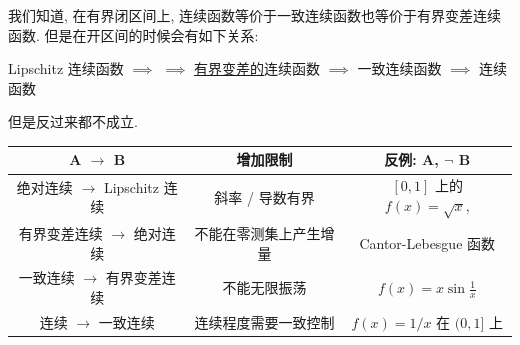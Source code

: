 \begin{rmk}
    我们知道, 在有界闭区间上, 连续函数等价于一致连续函数也等价于有界变差连续函数. 但是在开区间的时候会有如下关系:
    \begin{center}
        Lipschitz 连续函数 \(\implies\) \ACFunc{} \(\implies\) \hyperref[dfn:bounded-variation-function]{有界变差的}连续函数 \(\implies\) 一致连续函数 \(\implies\) 连续函数
    \end{center}
    但是反过来都不成立.
    \begin{center}
        \begin{tabular}{c|c|c}
            A \(\to\) B & 增加限制 & 反例: A, \(\lnot\) B \\
            \hline
            绝对连续 \(\to\) Lipschitz 连续 & 斜率 / 导数有界 & \([0,1]\) 上的 \(f(x)=\sqrt{x}\), \\
            有界变差连续 \(\to\) 绝对连续 & 不能在零测集上产生增量 & Cantor-Lebesgue 函数 \\
            一致连续 \(\to\) 有界变差连续 & 不能无限振荡 & \(f(x)=x\sin\frac{1}{x}\) \\
            连续 \(\to\) 一致连续 & 连续程度需要一致控制 & \(f(x)=1/x\) 在 \((0,1]\) 上
        \end{tabular}
    \end{center}
\end{rmk}
